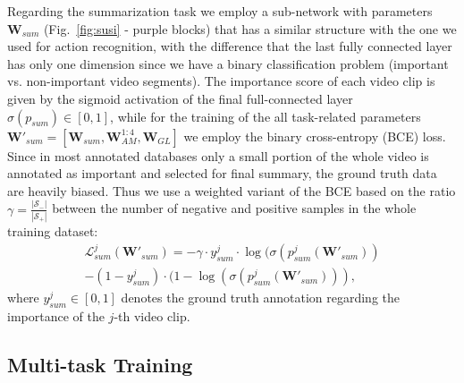 \documentclass[10pt,twocolumn,letterpaper]{article}
\begin{document}
Regarding the summarization task we employ a sub-network with parameters $\mathbf{W}_{sum}$ (Fig.~\ref{fig:susi} - purple blocks) that has a similar structure with the one we used for action recognition, with the difference that the last fully connected layer has only one dimension since we have a binary classification problem (important vs. non-important video segments). The importance score of each video clip is given by the sigmoid activation of the final full-connected layer $\sigma(p_{sum}) \in [0,1]$, while for the training of the all task-related parameters $\mathbf{W'}_{sum}=[\mathbf{W}_{sum}, \mathbf{W}_{AM}^{1:4}, \mathbf{W}_{GL}]$ we employ the binary cross-entropy (BCE) loss. Since in most annotated databases only a small portion of the whole video is annotated as important and selected for final summary, the ground truth data are heavily biased. Thus we use a weighted variant of the BCE based on the ratio $\gamma=\frac{|\mathcal{S}_-|}{|\mathcal{S}_+|}$ between the number of negative and positive samples in the whole training dataset:
\begin{equation}
\begin{split}
\mathcal{L}^j_{sum}(\mathbf{W}'_{sum}) = 
- \gamma \cdot y_{sum}^j \cdot \log(\sigma(p_{sum}^j(\mathbf{W}'_{sum})) \\
- (1-y_{sum}^j) \cdot (1-\log(\sigma(p_{sum}^j(\mathbf{W}'_{sum}))),
\end{split}
\end{equation}
where $y_{sum}^j \in [0,1]$ denotes the ground truth annotation regarding the importance of the $j$-th video clip.   

\subsection{Multi-task Training}
\end{document}
